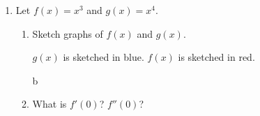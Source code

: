 \documentclass{article}
\begin{document}
\begin{enumerate}[resume]
\begin{enumerate}
    \begin{solution}
      We know that $f$ has $3$ critical points and we've already classified them.
      From our classifications, we can deduce that $f$ decreases on $(-\infty, -2)$,
      increases on $(-2, 0)$, decreases on $(0, 2)$, and increases on $(2, \infty)$. 
    \end{solution}

  \end{enumerate}

\item  


  Let $f(x) = x^3$ and $g(x) = x^4$.
  \begin{enumerate}
  \item


    \begin{problem}[\vfill\newpage]
      Sketch graphs of $f(x)$ and $g(x)$.
    \end{problem}

    \begin{solution}
      $g(x)$ is sketched in blue. $f(x)$ is sketched in red. 

      \hfill 
        \hfill {} \hfill b

    \end{solution}

  \item
    \begin{problem}[0.75in]
      What is $f'(0)$?  $f''(0)$? 
    \end{problem}


\end{enumerate}
\end{enumerate}
\end{document}
